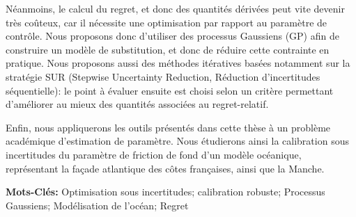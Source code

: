 \documentclass[12pt, a4paper]{article}
\begin{document}
Néanmoins, le calcul du regret, et donc des quantités dérivées peut
vite devenir très coûteux, car il nécessite une optimisation par
rapport au paramètre de contrôle. Nous proposons donc d'utiliser des
processus Gaussiens (GP) afin de construire un modèle de substitution,
et donc de réduire cette contrainte en pratique. Nous proposons aussi
des méthodes itératives basées notamment sur la stratégie SUR
(Stepwise Uncertainty Reduction, Réduction d'incertitudes
séquentielle): le point à évaluer ensuite est choisi selon un critère
permettant d'améliorer au mieux des quantités associées au
regret-relatif.

Enfin, nous appliquerons les outils présentés dans cette thèse à un
problème académique d'estimation de paramètre. Nous étudierons ainsi
la calibration sous incertitudes du paramètre de friction de fond d'un
modèle océanique, représentant la façade atlantique des côtes
françaises, ainsi que la Manche.

\vspace{0.5cm}
\textbf{Mots-Clés:} Optimisation sous incertitudes; calibration
robuste; Processus Gaussiens; Modélisation de l'océan; Regret
\vfill
\end{document}
